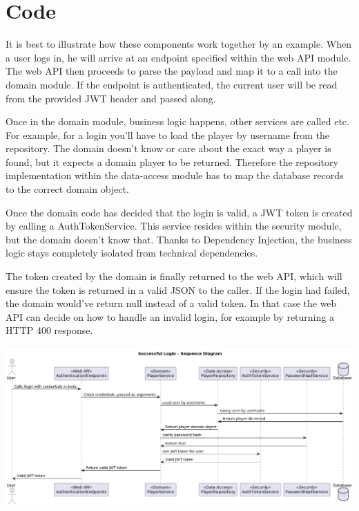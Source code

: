 \section{Code}
It is best to illustrate how these components work together by an example.
When a user logs in, he will arrive at an endpoint specified within the web API module.
The web API then proceeds to parse the payload and map it to a call into the domain module.
If the endpoint is authenticated, the current user will be read from the provided JWT header and passed along.

Once in the domain module, business logic happens, other services are called etc.
For example, for a login you'll have to load the player by username from the repository.
The domain doesn't know or care about the exact way a player is found, but it expects a domain player to be returned.
Therefore the repository implementation within the data-access module has to map the database records to the correct domain object.

Once the domain code has decided that the login is valid, a JWT token is created by calling a AuthTokenService.
This service resides within the security module, but the domain doesn't know that.
Thanks to Dependency Injection, the business logic stays completely isolated from technical dependencies.

The token created by the domain is finally returned to the web API, which will ensure the token is returned in a valid JSON to the caller.
If the login had failed, the domain would've return null instead of a valid token.
In that case the web API can decide on how to handle an invalid login, for example by returning a HTTP 400 response.

\includegraphics[width=\textwidth]{resources/diagrams/login-sequence}

\newpage

